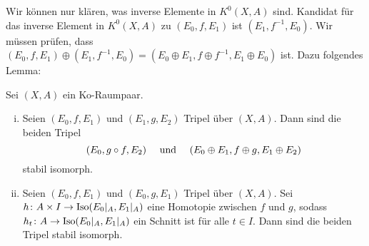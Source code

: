 Wir können nur klären, was inverse Elemente in $K^0(X,A)$ sind. Kandidat für das inverse Element in $K^0(X,A)$ zu $(E_0,f,E_1)$ ist $(E_1, f ^{-1},E_0)$. Wir müssen
prüfen, dass $(E_0,f,E_1) \oplus (E_1,f ^{-1}, E_0)= (E_0 \oplus E_1, f \oplus  f ^{-1},E_1 \oplus E_0)$ ist. Dazu folgendes Lemma:

\begin{lemma}[label=sub:34,{name=[Stabile Isomorphien gewisser Tripel]}]
Sei $(X,A)$ ein Ko-Raumpaar.
\begin{enumerate}[(i)]
	\item Seien $(E_0,f,E_1)$ und $(E_1,g,E_2)$ Tripel über $(X,A)$. Dann sind die beiden Tripel 
	\[
		(E_0,g \circ f, E_2) \quad  \text{ und } \quad \enbrace*{E_0 \oplus E_1, f \oplus g, E_1 \oplus E_2} 
	\]
	stabil isomorph.
	\item Seien $(E_0,f,E_1)$ und $(E_0,g,E_1)$ Tripel über $(X,A)$. Sei $h \colon A \times I \to \Iso \enbrace*{E_0|_A,E_1|_A} $ eine Homotopie zwischen $f$ und $g$, sodass 
	$h_t \colon A \to \Iso \enbrace*{E_0|_A,E_1|_A}$ ein Schnitt ist für alle $t \in I$. Dann sind die beiden Tripel stabil isomorph.
\end{enumerate}
\end{lemma}

